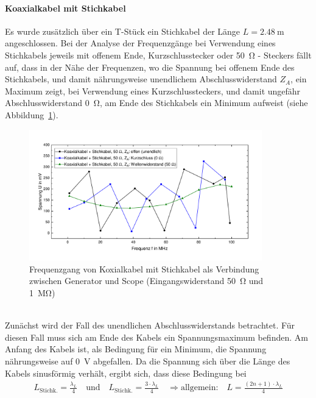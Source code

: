 \documentclass[a4paper,twoside,final]{article}
\begin{document}
\paragraph{Koaxialkabel mit Stichkabel}
Es wurde zusätzlich über ein T-Stück ein Stichkabel der Länge $L=\SI{2,48}{\metre}$ angeschlossen. Bei der Analyse der Frequenzgänge bei Verwendung eines Stichkabels jeweils mit offenem Ende, Kurzschlusstecker oder \SI{50}{\ohm} - Steckers fällt auf, dass in der Nähe der Frequenzen, wo die Spannung bei offenem Ende des Stichkabels, und damit nährungsweise unendlichem Abschlusswiderstand $Z_A$, ein Maximum zeigt, bei Verwendung eines Kurzschlussteckers, und damit ungefähr Abschlusswiderstand \SI{0}{\ohm}, am Ende des Stichkabels ein Minimum aufweist (siehe Abbildung~\ref{fig:Frequenzgang_Koaxialkabel_Stichkabel}).
\begin{figure}[htp]
    \centering
        \vspace{-0.5cm}
        \includegraphics[width=0.9\textwidth]{Bilder/Koaxialkabel_Stichkabel.pdf}
        \vspace{-0.25cm}
    \caption{Frequenzgang von Koxialkabel mit Stichkabel als Verbindung zwischen Generator und Scope (Eingangswiderstand \SI{50}{\ohm} und \SI{1}{\mega\ohm}) }
    \label{fig:Frequenzgang_Koaxialkabel_Stichkabel}
\end{figure}\\
Zunächst wird der Fall des unendlichen Abschlusswiderstands betrachtet. Für diesen Fall muss sich am Ende des Kabels ein Spannungsmaximum befinden. Am Anfang des Kabels ist, als Bedingung für ein Minimum, die Spannung nährungsweise auf \SI{0}{\volt} abgefallen. Da die Spannung sich über die Länge des Kabels sinusförmig verhält, ergibt sich, dass diese Bedingung bei
\begin{align}\label{equ:1/4,3/4}
  L_{\text{Stichk.}} = \frac{\lambda_{L}}{4} \quad \text{und} \quad L_{\text{Stichk.}} = \frac{3\cdot \lambda_{L}}{4}  \quad \Rightarrow \text{allgemein:}\quad L = \frac{(2n+1)\cdot \lambda_{L}}{4}
\end{align}
\end{document}
